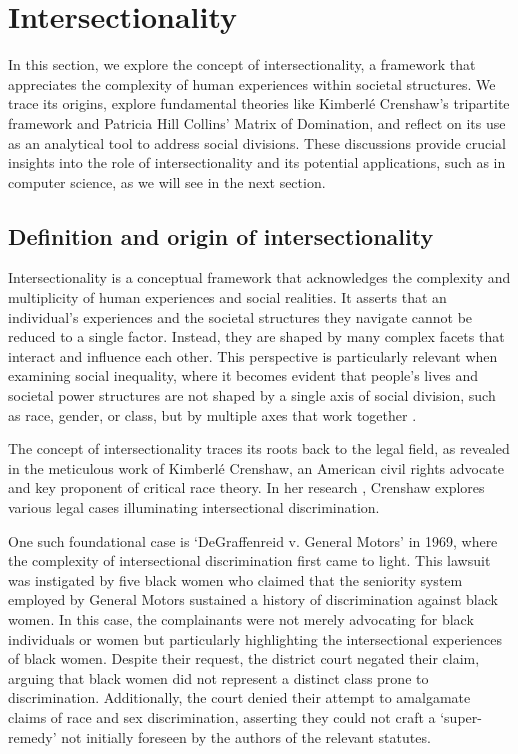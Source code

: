 \section{Intersectionality}
\label{ch:intersectionality}%

In this section, we explore the concept of intersectionality, a framework that appreciates the complexity of human experiences within societal structures. We trace its origins, explore fundamental theories like Kimberlé Crenshaw's tripartite framework and Patricia Hill Collins' Matrix of Domination, and reflect on its use as an analytical tool to address social divisions. These discussions provide crucial insights into the role of intersectionality and its potential applications, such as in computer science, as we will see in the next section.

\subsection{Definition and origin of intersectionality}
Intersectionality is a conceptual framework that acknowledges the complexity and multiplicity of human experiences and social realities. It asserts that an individual's experiences and the societal structures they navigate cannot be reduced to a single factor. Instead, they are shaped by many complex facets that interact and influence each other. This perspective is particularly relevant when examining social inequality, where it becomes evident that people's lives and societal power structures are not shaped by a single axis of social division, such as race, gender, or class, but by multiple axes that work together \cite{collins2020intersectionality}.

The concept of intersectionality traces its roots back to the legal field, as revealed in the meticulous work of Kimberlé Crenshaw, an American civil rights advocate and key proponent of critical race theory. In her research \cite{crenshaw1989demarginalizing}, Crenshaw explores various legal cases illuminating intersectional discrimination.

One such foundational case is `DeGraffenreid v. General Motors' in 1969, where the complexity of intersectional discrimination first came to light. This lawsuit was instigated by five black women who claimed that the seniority system employed by General Motors sustained a history of discrimination against black women. In this case, the complainants were not merely advocating for black individuals or women but particularly highlighting the intersectional experiences of black women. Despite their request, the district court negated their claim, arguing that black women did not represent a distinct class prone to discrimination. Additionally, the court denied their attempt to amalgamate claims of race and sex discrimination, asserting they could not craft a `super-remedy' not initially foreseen by the authors of the relevant statutes.


